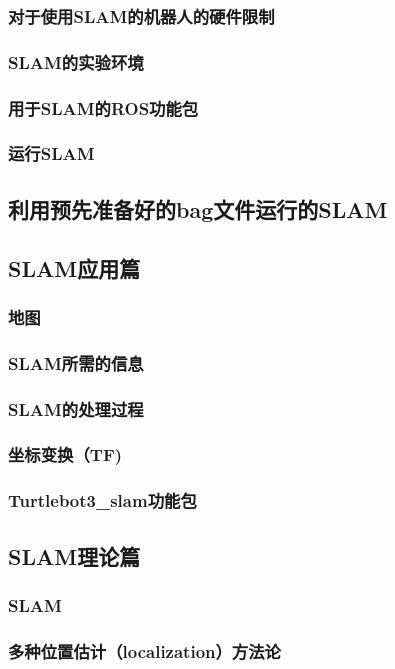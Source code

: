 \documentclass[geye,green,kindle,cn]{elegantnote}
\begin{document}
\subsubsection{对于使用SLAM的机器人的硬件限制}
\subsubsection{SLAM的实验环境}
\subsubsection{用于SLAM的ROS功能包}
\subsubsection{运行SLAM}
\subsection{利用预先准备好的bag文件运行的SLAM}
\subsection{SLAM应用篇}
\subsubsection{地图}
\subsubsection{SLAM所需的信息}
\subsubsection{SLAM的处理过程}
\subsubsection{坐标变换（TF)}
\subsubsection{Turtlebot3\_slam功能包}
\subsection{SLAM理论篇}
\subsubsection{SLAM}
\subsubsection{多种位置估计（localization）方法论}
\end{document}
